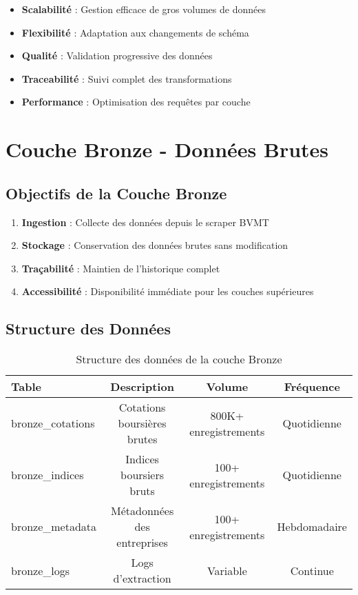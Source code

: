 \begin{itemize}
    \item \textbf{Scalabilité} : Gestion efficace de gros volumes de données
    \item \textbf{Flexibilité} : Adaptation aux changements de schéma
    \item \textbf{Qualité} : Validation progressive des données
    \item \textbf{Traceabilité} : Suivi complet des transformations
    \item \textbf{Performance} : Optimisation des requêtes par couche
\end{itemize}

\section{Couche Bronze - Données Brutes}

\subsection{Objectifs de la Couche Bronze}

\begin{enumerate}
    \item \textbf{Ingestion} : Collecte des données depuis le scraper BVMT
    \item \textbf{Stockage} : Conservation des données brutes sans modification
    \item \textbf{Traçabilité} : Maintien de l'historique complet
    \item \textbf{Accessibilité} : Disponibilité immédiate pour les couches supérieures
\end{enumerate}

\subsection{Structure des Données}

\begin{table}[H]
\centering
\begin{tabular}{|L|C|C|C|}
\hline
\textbf{Table} & \textbf{Description} & \textbf{Volume} & \textbf{Fréquence} \\
\hline
bronze\_cotations & Cotations boursières brutes & 800K+ enregistrements & Quotidienne \\
\hline
bronze\_indices & Indices boursiers bruts & 100+ enregistrements & Quotidienne \\
\hline
bronze\_metadata & Métadonnées des entreprises & 100+ enregistrements & Hebdomadaire \\
\hline
bronze\_logs & Logs d'extraction & Variable & Continue \\
\hline
\end{tabular}
\caption{Structure des données de la couche Bronze}
\label{tab:bronze_structure}
\end{table}

